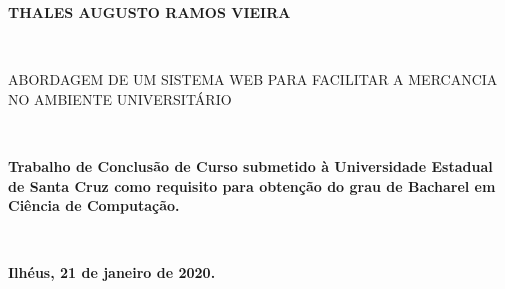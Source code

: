 
%
% 
%
\begin{folhadeaprovacao}


\begin{center}

    {\large \begin{large} \bfseries THALES AUGUSTO RAMOS VIEIRA \end{large}\\}
    \vspace{4cm}
    {\large\bfseries{\begin{large}ABORDAGEM DE UM SISTEMA WEB PARA FACILITAR A MERCANCIA NO AMBIENTE UNIVERSITÁRIO \end{large}}\\}
    \vspace{1cm}
    \hspace{.45\linewidth}
    \begin{minipage}{.50\linewidth}

            \textbf{Trabalho de Conclusão de Curso submetido à Universidade Estadual de Santa Cruz  como requisito para obtenção do grau de Bacharel em Ciência de Computação. }
    \end{minipage}
    \\
\end{center}
    \textbf{Ilhéus, 21 de janeiro de 2020.}
\begin{center}
           

    \bfseries{}
\end{center}


    \vspace{2.5cm}
    \vspace{3 cm}%

  
\end{folhadeaprovacao}